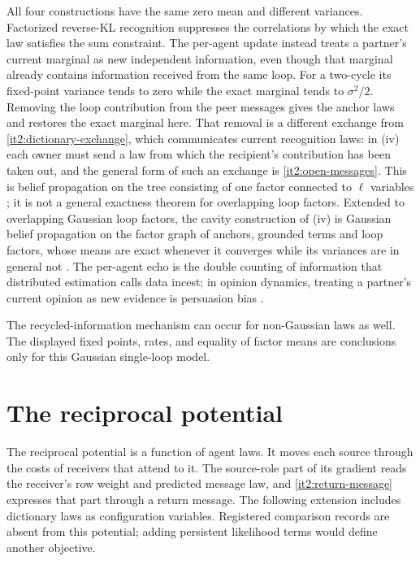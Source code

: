All four constructions have the same zero mean and different variances. Factorized reverse-KL recognition suppresses the correlations by which the exact law satisfies the sum constraint. The per-agent update instead treats a partner's current marginal as new independent information, even though that marginal already contains information received from the same loop. For a two-cycle its fixed-point variance tends to zero while the exact marginal tends to $\sigma^2/2$. Removing the loop contribution from the peer messages gives the anchor laws and restores the exact marginal here. That removal is a different exchange from \cref{it2:dictionary-exchange}, which communicates current recognition laws: in (iv) each owner must send a law from which the recipient's contribution has been taken out, and the general form of such an exchange is \cref{it2:open-messages}. This is belief propagation on the tree consisting of one factor connected to $\ell$ variables \citep{Pearl1988}; it is not a general exactness theorem for overlapping loop factors. Extended to overlapping Gaussian loop factors, the cavity construction of (iv) is Gaussian belief propagation on the factor graph of anchors, grounded terms and loop factors, whose means are exact whenever it converges while its variances are in general not \citep{WeissFreeman1999}. The per-agent echo is the double counting of information that distributed estimation calls data incest; in opinion dynamics, treating a partner's current opinion as new evidence is persuasion bias \citep{DeMarzoVayanosZwiebel2003}.

The recycled-information mechanism can occur for non-Gaussian laws as well. The displayed fixed points, rates, and equality of factor means are conclusions only for this Gaussian single-loop model.

\section{The reciprocal potential}
\label{it2:ch-reciprocal}

The reciprocal potential is a function of agent laws. It moves each source through the costs of receivers that attend to it. The source-role part of its gradient reads the receiver's row weight and predicted message law, and \cref{it2:return-message} expresses that part through a return message. The following extension includes dictionary laws as configuration variables. Registered comparison records are absent from this potential; adding persistent likelihood terms would define another objective.

